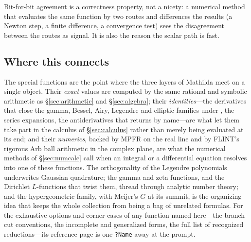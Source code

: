 Bit-for-bit agreement is a correctness property, not a nicety: a numerical method that
evaluates the same function by two routes and differences the results (a Newton step,
a finite difference, a convergence test) sees the disagreement between the routes as
signal. It is also the reason the scalar path is fast.

\subsection*{Where this connects}

The special functions are the point where the three layers of Mathilda meet on a
single object. Their \emph{exact} values are computed by the same rational and
symbolic arithmetic as \S\ref{sec:arithmetic} and \S\ref{sec:algebra}; their
\emph{identities}---the derivatives that close the gamma, Bessel, Airy, Legendre and
elliptic families under , the series expansions, the antiderivatives that
 returns by name---are what let them take part in the calculus of
\S\ref{sec:calculus} rather than merely being evaluated at its end; and their
\emph{numerics}, backed by MPFR on the real line and by FLINT's rigorous Arb ball
arithmetic in the complex plane, are what the numerical methods of
\S\ref{sec:numcalc} call when an integral or a differential equation resolves into
one of these functions. The orthogonality of the Legendre polynomials underwrites
Gaussian quadrature; the gamma and zeta functions, and the Dirichlet
\(L\)-functions that twist them, thread through analytic number theory; and the
hypergeometric family, with Meijer's \(G\) at its summit, is the organizing idea that keeps the whole
collection from being a bag of unrelated formulas. For the exhaustive options and
corner cases of any function named here---the branch-cut conventions, the incomplete
and generalized forms, the full list of recognized reductions---its reference page
is one \texttt{?Name} away at the prompt.

